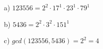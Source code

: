 
a) $123556 = 2^2 \cdot 17^1 \cdot 23^1 \cdot 79^1$

b) $5436 = 2^2 \cdot 3^2 \cdot 151^1$

c) $gcd(123556, 5436) = 2^2 = 4$
